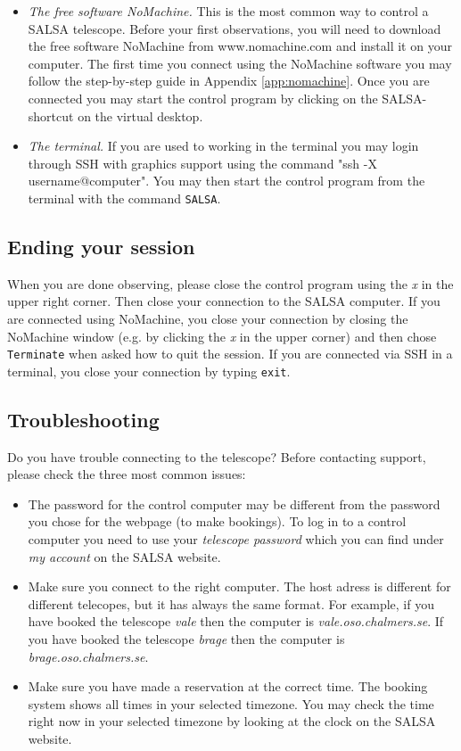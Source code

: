 \begin{itemize}
	\item{\emph{The free software NoMachine.} This is the most common way to control a
SALSA telescope. Before your first observations, you will need to download
the free software NoMachine from  www.nomachine.com and install it on
your computer.  The first time you connect using the NoMachine software you may
follow the step-by-step guide in Appendix \ref{app:nomachine}.} Once you are
connected you may start the control program by clicking on the SALSA-shortcut
on the virtual desktop.
\item{\emph{The terminal.} If you are used to working in the terminal you may login
	through SSH with graphics support using the command "ssh -X
username@computer".  You may then start the control program from the terminal
with the command {\tt  SALSA}.}
\end{itemize}

\subsection{Ending your session}
When you are done observing, please close the control program using the
\emph{x} in the upper right corner. Then close your connection to the SALSA
computer. If you are connected using NoMachine, you close your connection by
closing the NoMachine window (e.g. by clicking the \emph{x} in the upper corner) 
and then chose {\tt Terminate} when asked how to quit the
session. If you are connected via SSH in a terminal, you close your connection by 
typing {\tt exit}.

\subsection{Troubleshooting}
Do you have trouble connecting to the telescope? Before contacting support,
please check the three most common issues:
\begin{itemize} 
\item The password for the control computer may be different from the password
you chose for the webpage (to make bookings). To log in to a control computer
you need to use your \emph{telescope password} which you can find under
\emph{my account} on the SALSA website.
\item Make sure you connect to the right computer. The host adress is different
for different telecopes, but it has always the same format. For example, if
you have booked the telescope \emph{vale} then the computer is
\emph{vale.oso.chalmers.se}. If you have booked the telescope \emph{brage}
then the computer is \emph{brage.oso.chalmers.se}. 
\item Make sure you have made a reservation at the correct time. The booking
	system shows all times in your selected timezone. You may check the time
	right now in your selected timezone by looking at the clock on the SALSA
	website. 
\end{itemize}

